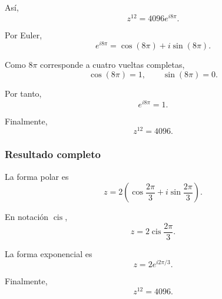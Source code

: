 \documentclass[12pt]{article}
\begin{document}
Así,
\[
z^{12}
=
4096e^{i8\pi}.
\]

Por Euler,
\[
e^{i8\pi}
=
\cos(8\pi)+i\sin(8\pi).
\]

Como $8\pi$ corresponde a cuatro vueltas completas,
\[
\cos(8\pi)=1,
\qquad
\sin(8\pi)=0.
\]

Por tanto,
\[
e^{i8\pi}=1.
\]

Finalmente,
\[
\boxed{
z^{12}=4096
}.
\]

\subsubsection*{Resultado completo}

La forma polar es
\[
\boxed{
z=
2\left(
\cos\frac{2\pi}{3}
+
i\sin\frac{2\pi}{3}
\right)
}.
\]

En notación $\operatorname{cis}$,
\[
\boxed{
z=
2\operatorname{cis}\frac{2\pi}{3}
}.
\]

La forma exponencial es
\[
\boxed{
z=2e^{i2\pi/3}
}.
\]

Finalmente,
\[
\boxed{
z^{12}=4096
}.
\]
\end{document}
